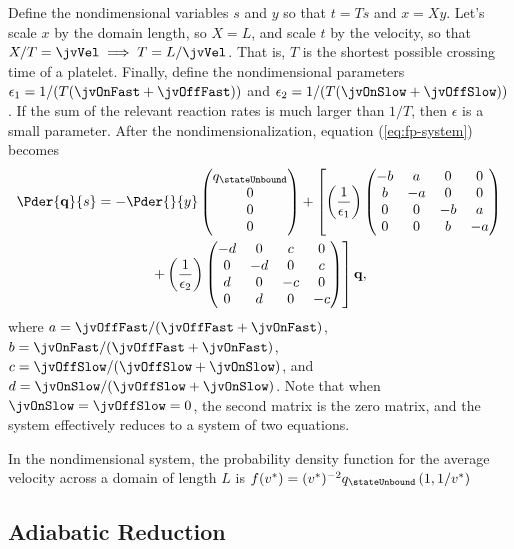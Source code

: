 Define the nondimensional variables $s$ and $y$ so that $t = Ts$ and
$x = Xy$. Let's scale $x$ by the domain length, so $X = L$, and scale
$t$ by the velocity, so that $X/T = \jvVel \implies T = L/\jvVel$. That
is, $T$ is the shortest possible crossing time of a platelet. Finally,
define the nondimensional parameters
$\epsilon_1 = 1/(T(\jvOnFast + \jvOffFast))$ and
$\epsilon_2 = 1/(T(\jvOnSlow + \jvOffSlow))$. If the sum of the relevant
reaction rates is much larger than $1/T$, then $\epsilon$ is a small
parameter. After the nondimensionalization, equation
(\ref{eq:fp-system}) becomes
\begin{multline}
  \label{eq:nd-system}
  \Pder{\mathbf{q}}{s} = -\Pder{}{y}
  \begin{pmatrix}
    q_{\stateUnbound} \\ 0 \\ 0 \\ 0
  \end{pmatrix}
  + \left[\left(\frac{1}{\epsilon_1}\right) 
  \begin{pmatrix}
    - b & a & 0 & 0 \\
    b & - a & 0 & 0 \\
    0 & 0 & - b & a \\
    0 & 0 & b & - a
  \end{pmatrix} \right.
  \\
  \left. + \left(\frac{1}{\epsilon_2}\right)
  \begin{pmatrix}
    - d & 0 & c & 0 \\
    0 & - d & 0 & c \\
    d & 0 & - c & 0 \\
    0 & d & 0 & - c
  \end{pmatrix}\right]
  \mathbf{q},
\end{multline}
where $a = \jvOffFast/(\jvOffFast + \jvOnFast)$,
$b = \jvOnFast/(\jvOffFast + \jvOnFast)$,
$c = \jvOffSlow/(\jvOffSlow + \jvOnSlow)$, and
$d = \jvOnSlow/(\jvOffSlow + \jvOnSlow)$. Note that when
$\jvOnSlow = \jvOffSlow = 0$, the second matrix is the zero matrix, and
the system effectively reduces to a system of two equations.

In the nondimensional system, the probability density function for the
average velocity across a domain of length $L$ is 
$f(v^*) = ({v^*})^{-2} q_{\stateUnbound} \left(1, 1/v^*\right)$

\subsection{Adiabatic Reduction}
\label{sec:adiabatic-reduction}


